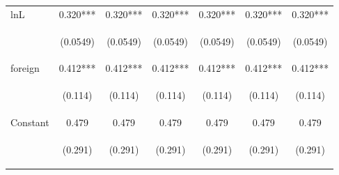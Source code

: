 \begin{center}
\begin{tabular}{lcccccc}
lnL & 0.320*** & 0.320*** & 0.320*** & 0.320*** & 0.320*** & 0.320*** \\
\vspace{4pt} & \begin{footnotesize}(0.0549)\end{footnotesize} & \begin{footnotesize}(0.0549)\end{footnotesize} & \begin{footnotesize}(0.0549)\end{footnotesize} & \begin{footnotesize}(0.0549)\end{footnotesize} & \begin{footnotesize}(0.0549)\end{footnotesize} & \begin{footnotesize}(0.0549)\end{footnotesize} \\
foreign & 0.412*** & 0.412*** & 0.412*** & 0.412*** & 0.412*** & 0.412*** \\
\vspace{4pt} & \begin{footnotesize}(0.114)\end{footnotesize} & \begin{footnotesize}(0.114)\end{footnotesize} & \begin{footnotesize}(0.114)\end{footnotesize} & \begin{footnotesize}(0.114)\end{footnotesize} & \begin{footnotesize}(0.114)\end{footnotesize} & \begin{footnotesize}(0.114)\end{footnotesize} \\
Constant & 0.479 & 0.479 & 0.479 & 0.479 & 0.479 & 0.479 \\
 & \begin{footnotesize}(0.291)\end{footnotesize} & \begin{footnotesize}(0.291)\end{footnotesize} & \begin{footnotesize}(0.291)\end{footnotesize} & \begin{footnotesize}(0.291)\end{footnotesize} & \begin{footnotesize}(0.291)\end{footnotesize} & \begin{footnotesize}(0.291)\end{footnotesize} \\

\end{tabular}
\end{center}
